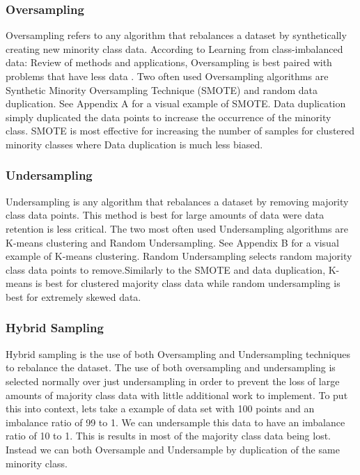 \subsubsection{Oversampling}
Oversampling refers to any algorithm that rebalances a dataset by synthetically creating new minority class data. According to Learning from class-imbalanced data: Review of methods and applications, Oversampling
is best paired with problems that have less data \cite{Imbalsourceold}. Two often used Oversampling algorithms are Synthetic Minority Oversampling Technique (SMOTE) and random data duplication. See Appendix A for a visual example of SMOTE.
Data duplication simply duplicated the data points to increase the occurrence of the minority class. SMOTE is most effective for increasing the number of samples for clustered minority classes where Data duplication is much less biased.

\subsubsection{Undersampling}
Undersampling is any algorithm that rebalances a dataset by removing majority class data points. This method is best for large amounts of data were data retention is less critical. The two most often used Undersampling algorithms are K-means clustering and Random Undersampling. See Appendix B for a visual example of K-means
clustering. Random Undersampling selects random majority class data points to remove.Similarly to the SMOTE and data duplication, K-means is best for clustered majority class data while random undersampling is best for extremely skewed data.

\subsubsection{Hybrid Sampling}
Hybrid sampling is the use of both Oversampling and Undersampling techniques to rebalance the dataset. The use of both oversampling and undersampling is selected normally over just undersampling in order to prevent the loss of large amounts of majority class data with little additional work to implement. To put this into context, lets take a example of data set with 100 points and an imbalance ratio of 99 to 1. We can undersample this data to have an imbalance ratio of 10 to 1. This is results in most of the majority class data being lost. Instead we can both Oversample and Undersample by duplication of the same minority class.

